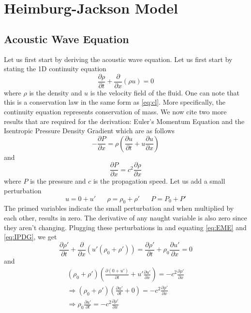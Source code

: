 \documentclass{article}
\newcommand{\pd}[2]{\frac{\partial #1}{\partial #2}}
\newcommand{\twen}{\hspace{20pt}}
\numberwithin{equation}{section}
\begin{document}
\newpage







\section{Heimburg-Jackson Model}
\subsection{Acoustic Wave Equation}
Let us first start by deriving the acoustic wave equation. Let us first start by stating the 1D continuity equation 
\begin{equation}
    \pd{\rho}{t} +\pd{}{x}(\rho u) =0
\end{equation}
where $\rho$ is the density and $u$ is the velocity field of the fluid. One can note that this is a conservation law in the same form as \eqref{eq:cl}. More specifically, the continuity equation represents conservation of mass. We now cite two more results that are required for the derivation: Euler's Momentum Equation and the Isentropic Pressure Density Gradient which are as follows
\begin{equation}
    -\pd{P}{x} = \rho\left(\pd{u}{t}+u\pd{u}{x}\right) \label{eq:EME}
\end{equation}
and 
\begin{equation}
    \pd{P}{x} =c^2 \pd{\rho}{x} \label{eq:IPDG}
\end{equation}
where $P$ is the pressure and $c$ is the propagation speed. Let us add a small perturbation 
\begin{equation*}
    u=0+u' \twen \rho = \rho_0+\rho' \twen P =P_0+P'
\end{equation*}
The primed variables indicate the small perturbation and when multiplied by each other, results in zero. The derivative of any naught variable is also zero since they aren't changing. Plugging these perturbations in and equating \eqref{eq:EME} and \eqref{eq:IPDG}, we get 
\begin{equation}
    \pd{\rho '}{t}+\pd{}{x}(u'(\rho_0+\rho')) = \pd{\rho '}{t} +\rho_0\pd{u'}{x} = 0 \label{eq:5.4}
\end{equation}
and 
\begin{equation}
\begin{split}
    (\rho_0 +\rho')\left( \pd{(0+u')}{t} + u'\pd{u'}{x} \right) = -c^2 \pd{\rho'}{x}\\
    \Rightarrow (\rho_0 +\rho')\left( \pd{u'}{t} + 0 \right) = -c^2 \pd{\rho ' }{x} \\
    \Rightarrow\rho_0 \pd{u'}{t} =-c^2 \pd{\rho'}{x} \label{eq:5.5}
\end{split}
\end{equation}
\end{document}
